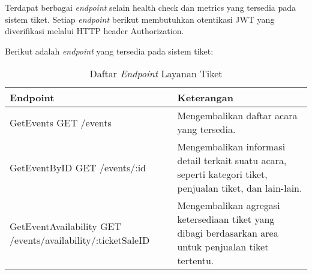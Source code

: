 Terdapat berbagai \textit{endpoint} selain health check dan metrics yang tersedia pada sistem tiket. Setiap \textit{endpoint} berikut membutuhkan otentikasi JWT yang diverifikasi melalui HTTP header Authorization.

Berikut adalah \textit{endpoint} yang tersedia pada sistem tiket:

\begin{table}[h!]
    \centering
    \caption{Daftar \textit{Endpoint} Layanan Tiket}
    \begin{tabular}{|p{}|p{}|}
        \hline
        \textbf{Endpoint}                                                    & \textbf{Keterangan}                                                                                                                                                                                                                                                                                                                                                                            \\
        \hline
        GetEvents \newline GET /events                                       & Mengembalikan daftar acara yang tersedia.                                                                                                                                                                                                                                                                                                                                                      \\
        \hline
        GetEventByID \newline GET /events/:id                                & Mengembalikan informasi detail terkait suatu acara, seperti kategori tiket, penjualan tiket, dan lain-lain.                                                                                                                                                                                                                                                                                    \\
        \hline
        GetEventAvailability \newline GET /events/availability/:ticketSaleID & Mengembalikan agregasi ketersediaan tiket yang dibagi berdasarkan area untuk penjualan tiket tertentu.                                                                                                                                                                                                                                                                                         \\

\end{tabular}
\end{table}
